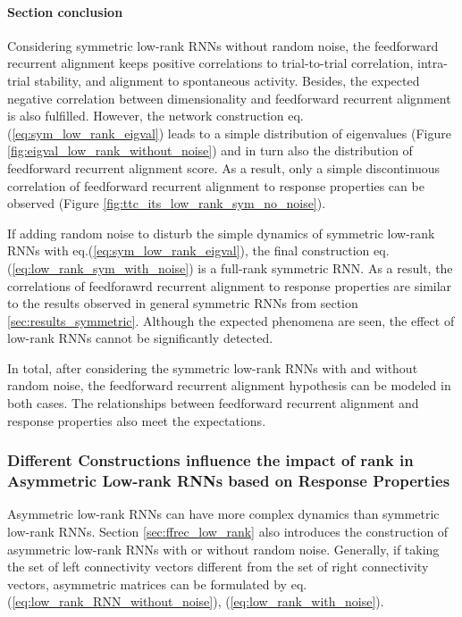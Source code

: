 \documentclass[11pt]{article}
\begin{document}
	\paragraph{Section conclusion}
	
	Considering symmetric low-rank RNNs without random noise, the feedforward recurrent alignment keeps positive correlations to trial-to-trial correlation, intra-trial stability, and alignment to spontaneous activity. Besides, the expected negative correlation between dimensionality and feedforward recurrent alignment is also fulfilled. However, the network construction eq.(\ref{eq:sym_low_rank_eigval}) leads to a simple distribution of eigenvalues (Figure \ref{fig:eigval_low_rank_without_noise}) and in turn also the distribution of feedforward recurrent alignment score. As a result, only a simple discontinuous correlation of feedforward recurrent alignment to response properties can be observed (Figure \ref{fig:ttc_its_low_rank_sym_no_noise}). 
	
	If adding random noise to disturb the simple dynamics of symmetric low-rank RNNs with eq.(\ref{eq:sym_low_rank_eigval}), the final construction eq.(\ref{eq:low_rank_sym_with_noise}) is a full-rank symmetric RNN. As a result, the correlations of feedforawrd recurrent alignment to response properties are similar to the results observed in general symmetric RNNs from section \ref{sec:results_symmetric}. Although the expected phenomena are seen, the effect of low-rank RNNs cannot be significantly detected. 
	
	In total, after considering the symmetric low-rank RNNs with and without random noise, the feedforward recurrent alignment hypothesis can be modeled in both cases. The relationships between feedforward recurrent alignment and response properties also meet the expectations. %
	
	\subsubsection{Different Constructions influence the impact of rank in Asymmetric Low-rank RNNs based on Response Properties}
	
	Asymmetric low-rank RNNs can have more complex dynamics than symmetric low-rank RNNs. Section \ref{sec:ffrec_low_rank} also introduces the construction of asymmetric low-rank RNNs with or without random noise. Generally, if taking the set of left connectivity vectors different from the set of right connectivity vectors, asymmetric matrices can be formulated by eq.(\ref{eq:low_rank_RNN_without_noise}), (\ref{eq:low_rank_with_noise}). 
	
\end{document}
